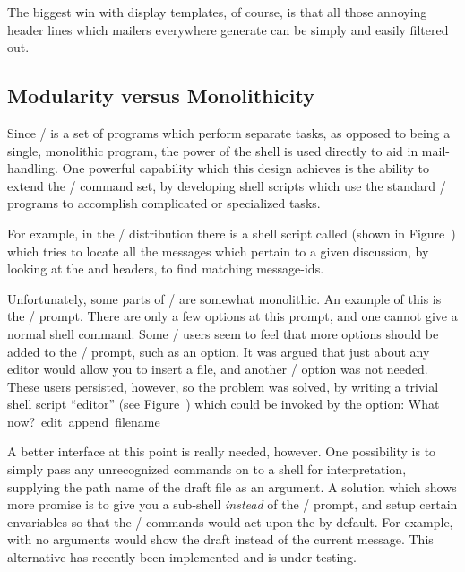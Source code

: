 The biggest win with display templates,
of course,
is that all those annoying header lines which mailers
everywhere generate can be simply and easily filtered out.

\subsection{Modularity versus Monolithicity}	%
Since \MH/ is a set of programs
which perform separate tasks,
as opposed to being a single, monolithic program,
the power of the shell is used directly to aid in mail-handling.
One powerful capability which this design achieves is the ability to extend
the \MH/ command set,
by developing shell scripts which use the standard \MH/
programs to accomplish complicated or specialized tasks.

For example,
in the \MH/ distribution there is a shell script
called  (shown in Figure~\mpick)
which tries to locate all the messages which pertain to a given discussion,
by looking at the  and  headers,
to find matching message-ids.%

Unfortunately, some parts of \MH/ are somewhat monolithic.
An example of this is the \whatnow/ prompt.
There are only a few options at this prompt,
and one cannot give a normal shell command.
Some \MH/ users seem to feel that more options should be added to
the \whatnow/ prompt, such as an  option.
It was argued that just about any editor would allow you to 
insert a file, and another \whatnow/ option was not needed.
These users persisted, however, so the
problem was solved, by writing a trivial shell
script ``editor'' (see Figure~\appended)
which could be invoked by the  option:
\example What now?\ edit\ append\ filename\endexample

A better interface at this point is really needed, however.
One possibility is to simply pass any unrecognized commands on
to a shell for interpretation, supplying the path name of the draft file
as an argument.
A solution which shows more promise is to give you a sub-shell
{\it instead} of the \whatnow/ prompt,
and setup certain envariables so that
the \MH/ commands would act upon the  by default.
For example,  with no  arguments
would show the draft instead of the current message.
This alternative has recently been implemented and is under testing.

